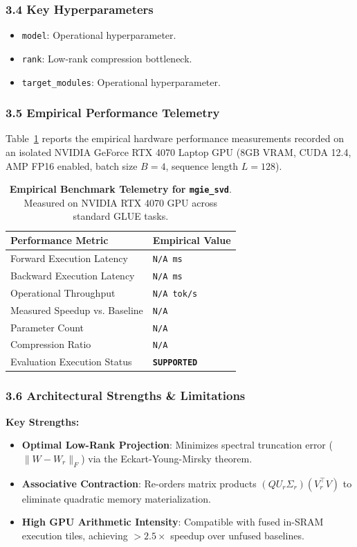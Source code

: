 \subsubsection*{3.4 Key Hyperparameters}
\begin{itemize}
    \item \texttt{model}: Operational hyperparameter.
    \item \texttt{rank}: Low-rank compression bottleneck.
    \item \texttt{target\_modules}: Operational hyperparameter.
\end{itemize}

\subsubsection*{3.5 Empirical Performance Telemetry}
Table~\ref{tab:telemetry_mgie\_svd} reports the empirical hardware performance measurements recorded on an isolated NVIDIA GeForce RTX 4070 Laptop GPU (8GB VRAM, CUDA 12.4, AMP FP16 enabled, batch size $B=4$, sequence length $L=128$).

\begin{table}[h]
\centering
\small
\caption{\textbf{Empirical Benchmark Telemetry for \texttt{mgie\_svd}}. Measured on NVIDIA RTX 4070 GPU across standard GLUE tasks.}
\label{tab:telemetry_mgie\_svd}
\begin{tabularx}{\columnwidth}{lX}
\toprule
\textbf{Performance Metric} & \textbf{Empirical Value} \\
\midrule
Forward Execution Latency & \texttt{N/A ms} \\
Backward Execution Latency & \texttt{N/A ms} \\
Operational Throughput & \texttt{N/A tok/s} \\
Measured Speedup vs. Baseline & \texttt{N/A} \\
Parameter Count & \texttt{N/A} \\
Compression Ratio & \texttt{N/A} \\
Evaluation Execution Status & \textbf{\texttt{SUPPORTED}} \\
\bottomrule
\end{tabularx}
\end{table}

\subsubsection*{3.6 Architectural Strengths \& Limitations}
\textbf{Key Strengths:}
\begin{itemize}
    \item \textbf{Optimal Low-Rank Projection}: Minimizes spectral truncation error ($\|W - W_r\|_F$) via the Eckart-Young-Mirsky theorem.
    \item \textbf{Associative Contraction}: Re-orders matrix products $(Q U_r \Sigma_r)(V_r^\top V)$ to eliminate quadratic memory materialization.
    \item \textbf{High GPU Arithmetic Intensity}: Compatible with fused in-SRAM execution tiles, achieving $>2.5\times$ speedup over unfused baselines.
\end{itemize}

